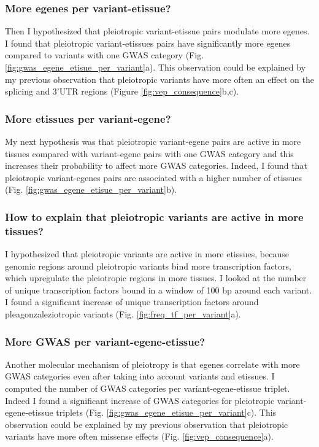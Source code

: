\subsubsection*{More egenes per variant-etissue?}

Then I hypothesized that pleiotropic variant-etissue pairs modulate more egenes.
%
I found that pleiotropic variant-etissues pairs have significantly more egenes compared to variants with one GWAS category (Fig. \ref{fig:gwas_egene_etisue_per_variant}a).
%
This observation could be explained by my previous observation that pleiotropic variants have more often an effect on the splicing and 3'UTR regions (Figure \ref{fig:vep_consequence}b,c).

\subsubsection*{More etissues per variant-egene?}

My next hypothesis was that pleiotropic variant-egene pairs are active in more tissues compared with variant-egene pairs with one GWAS category and this increases their probability to affect more GWAS categories.
%
Indeed, I found that pleiotropic variant-egenes pairs are associated with a higher number of etissues (Fig. \ref{fig:gwas_egene_etisue_per_variant}b).

\subsubsection*{How to explain that pleiotropic variants are active in more tissues?}

I hypothesized that pleiotropic variants are active in more etissues, because genomic regions around pleiotropic variants bind more transcription factors, which upregulate the pleiotropic regions in more tissues.
%
I looked at the number of unique transcription factors bound in a window of 100 bp around each variant.
%
I found a significant increase of unique transcription factors around pleagonzaleziotropic variants (Fig. \ref{fig:freq_tf_per_variant}a).


\subsubsection*{More GWAS per variant-egene-etissue?}

Another molecular mechanism of pleiotropy is that egenes correlate with more GWAS categories even after taking into account variants and etissues.
%
I computed the number of GWAS categories per variant-egene-etissue triplet.
%
Indeed I found a significant increase of GWAS categories for pleiotropic variant-egene-etissue triplets (Fig. \ref{fig:gwas_egene_etisue_per_variant}c).
%
This observation could be explained by my previous observation that pleiotropic variants have more often missense effects (Fig. \ref{fig:vep_consequence}a).

